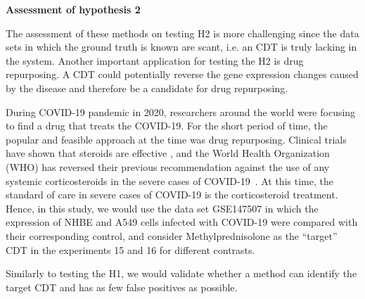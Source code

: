 \textbf{Assessment of hypothesis 2}

The assessment of these methods on testing H2 is more challenging since the data sets in which the ground truth is known are scant, i.e. an CDT is truly lacking in the system. Another important application for testing the H2 is drug repurposing. A CDT could potentially reverse the  gene expression changes caused by the disease and therefore be a candidate for drug repurposing. 


During COVID-19 pandemic in 2020,  researchers around the world were focusing to find a drug that treats the COVID-19. For the short period of time, the popular and feasible approach at the time was drug repurposing. Clinical trials have shown that  steroids are effective \cite{meduri2020pharmacological, corral2021methylprednisolone,salton2020prolonged, meduri2020pharmacological, cochrane1996systemic, prescott2020corticosteroids}, and the World Health Organization (WHO) has reversed their previous recommendation against the use of any systemic corticosteroids in the severe cases of COVID-19~\cite{wilson2020covid}. At this time, the standard of care in severe cases of COVID-19 is the corticosteroid treatment. 
Hence, in this study, we would use the data set GSE147507 in which the expression of NHBE and A549 cells infected with COVID-19 were compared with their corresponding control, and consider Methylprednisolone as the ``target'' CDT in the experiments 15 and 16 for different contrasts. %

Similarly to testing the H1, we would validate whether a method can identify the target CDT and has as few false positives as possible.
%

